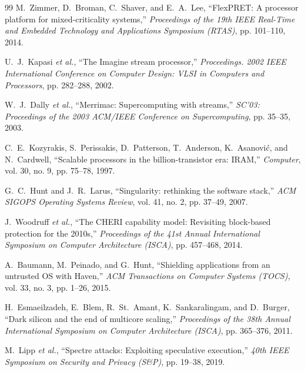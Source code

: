 \documentclass[twocolumn]{article}
\begin{document}
\begin{thebibliography}{99}
M.~Zimmer, D.~Broman, C.~Shaver, and E.~A.~Lee,
``FlexPRET: A processor platform for mixed-criticality systems,''
\emph{Proceedings of the 19th IEEE Real-Time and Embedded Technology and Applications Symposium (RTAS)}, pp. 101--110, 2014.

U.~J.~Kapasi \emph{et al.},
``The Imagine stream processor,''
\emph{Proceedings. 2002 IEEE International Conference on Computer Design: VLSI in Computers and Processors}, pp. 282--288, 2002.

W.~J.~Dally \emph{et al.},
``Merrimac: Supercomputing with streams,''
\emph{SC'03: Proceedings of the 2003 ACM/IEEE Conference on Supercomputing}, pp. 35--35, 2003.

C.~E.~Kozyrakis, S.~Perissakis, D.~Patterson, T.~Anderson, K.~Asanovi\'{c}, and N.~Cardwell,
``Scalable processors in the billion-transistor era: IRAM,''
\emph{Computer}, vol. 30, no. 9, pp. 75--78, 1997.

G.~C.~Hunt and J.~R.~Larus,
``Singularity: rethinking the software stack,''
\emph{ACM SIGOPS Operating Systems Review}, vol. 41, no. 2, pp. 37--49, 2007.

J.~Woodruff \emph{et al.},
``The CHERI capability model: Revisiting block-based protection for the 2010s,''
\emph{Proceedings of the 41st Annual International Symposium on Computer Architecture (ISCA)}, pp. 457--468, 2014.

A.~Baumann, M.~Peinado, and G.~Hunt,
``Shielding applications from an untrusted OS with Haven,''
\emph{ACM Transactions on Computer Systems (TOCS)}, vol. 33, no. 3, pp. 1--26, 2015.





H.~Esmaeilzadeh, E.~Blem, R.~St.~Amant, K.~Sankaralingam, and D.~Burger,
``Dark silicon and the end of multicore scaling,''
\emph{Proceedings of the 38th Annual International Symposium on Computer Architecture (ISCA)}, pp. 365--376, 2011.

M.~Lipp \emph{et al.},
``Spectre attacks: Exploiting speculative execution,''
\emph{40th IEEE Symposium on Security and Privacy (S\&P)}, pp. 19--38, 2019.


\end{thebibliography}
\end{document}
